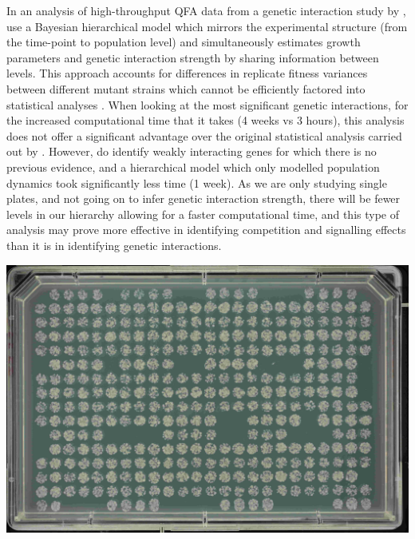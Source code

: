 In an analysis of high-throughput QFA data from a genetic interaction
study by \citet{Addinall2011}, \citet{Heydari2016} use a Bayesian
hierarchical model which mirrors the experimental structure (from the
time-point to population level) and simultaneously estimates growth
parameters and genetic interaction strength by sharing information
between levels. This approach accounts for differences in replicate
fitness variances between different mutant strains which cannot be
efficiently factored into statistical analyses
\citep{Heydari2016}. When looking at the most significant genetic
interactions, for the increased computational time that it takes (4
weeks vs 3 hours), this analysis does not offer a significant
advantage over the original statistical analysis carried out by
\citet{Addinall2011}. However, \citet{Heydari2016} do identify weakly
interacting genes for which there is no previous evidence, and a
hierarchical model which only modelled population dynamics took
significantly less time (1 week). As we are only studying single
plates, and not going on to infer genetic interaction strength, there
will be fewer levels in our hierarchy allowing for a faster
computational time, and this type of analysis may prove more effective in
identifying competition and signalling effects than it is in identifying genetic
interactions.

\begin{Figure}
  \centering
  \includegraphics[width=\linewidth]{DLR00012647-2009-07-02_23-12-49}
  \label{fig:gaps}
\end{Figure}

